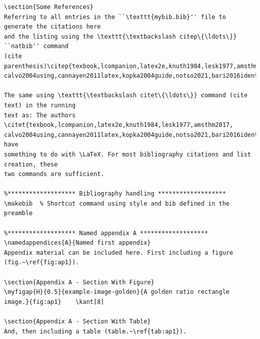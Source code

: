 \documentclass{article}
\begin{document}
\begin{verbatim}
\section{Some References}
Referring to all entries in the ``\texttt{mybib.bib}'' file to generate the citations here
and the listing using the \texttt{\textbackslash citep\{\ldots\}} ``natbib'' command
(cite parenthesis)\citep{texbook,lcompanion,latex2e,knuth1984,lesk1977,amsthm2017,
calvo2004using,cannayen2011latex,kopka2004guide,notso2021,bari2016identification}.

The same using \texttt{\textbackslash citet\{\ldots\}} command (cite text) in the running
text as: The authors \citet{texbook,lcompanion,latex2e,knuth1984,lesk1977,amsthm2017,
calvo2004using,cannayen2011latex,kopka2004guide,notso2021,bari2016identification} have 
something to do with \LaTeX. For most bibliography citations and list creation, these 
two commands are sufficient.

%******************* Bibliography handling *******************
\makebib  % Shortcut command using style and bib defined in the preamble

%******************* Named appendix A *******************
\namedappendices{A}{Named first appendix}
Appendix material can be included here. First including a figure (fig.~\ref{fig:ap1}).

\section{Appendix A - Section With Figure}
\myfigap{H}{0.5}{example-image-golden}{A golden ratio rectangle image.}{fig:ap1}	\kant[8]

\section{Appendix A - Section With Table}
And, then including a table (table.~\ref{tab:ap1}).


\end{verbatim}
\end{document}
